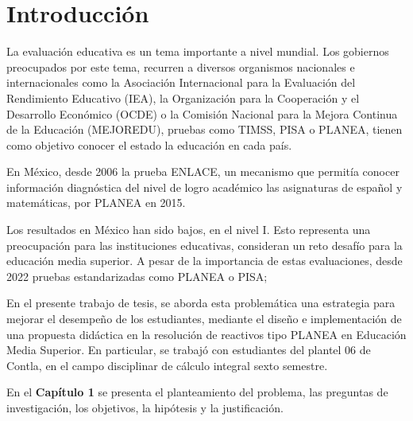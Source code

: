 \chapter*{Introducción}
\setcounter{page}{1}


\noindent La evaluación educativa es un tema importante a nivel mundial. Los gobiernos  preocupados por este tema, recurren a diversos organismos nacionales e internacionales como la Asociación Internacional para la Evaluación del Rendimiento Educativo (IEA), la Organización para la Cooperación y el Desarrollo Económico (OCDE) o la Comisión Nacional para la Mejora Continua de la Educación (MEJOREDU),  pruebas como TIMSS, PISA o PLANEA,  tienen como objetivo conocer el estado  la educación en cada país.

\noindent En México, desde 2006  la prueba ENLACE,  un mecanismo que permitía conocer información diagnóstica del nivel de logro académico  las asignaturas de español y matemáticas,  por PLANEA en 2015.

\noindent Los resultados en México  han sido bajos,  en el nivel I. Esto representa una preocupación para las instituciones educativas,  consideran  un reto  desafío para la educación media superior. A pesar de la importancia de estas evaluaciones, desde 2022  pruebas estandarizadas como PLANEA o PISA; 

\noindent En el presente trabajo de tesis, se aborda esta problemática  una estrategia para mejorar el desempeño de los estudiantes, mediante el diseño e implementación de una propuesta didáctica  en la resolución de reactivos tipo PLANEA en Educación Media Superior. En particular, se trabajó con estudiantes del plantel 06 de Contla, en el campo disciplinar de cálculo integral  sexto semestre.

\noindent {}

\noindent En el \textbf{Capítulo 1} se presenta el planteamiento del problema, las preguntas de investigación, los objetivos, la hipótesis y la justificación.

